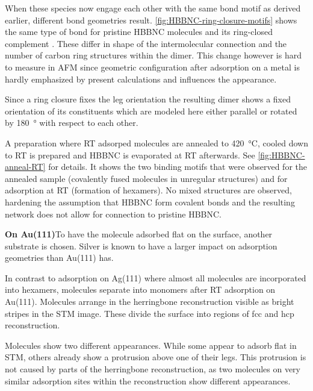 When these species now engage each other with the same bond motif as derived earlier, different bond geometries result. \autoref{fig:HBBNC-ring-closure-motifs} shows the same type of bond for pristine HBBNC molecules   and its ring-closed complement . These differ in shape of the intermolecular connection and the number of carbon ring structures within the dimer. This change however is hard to measure in AFM since geometric configuration after adsorption on a metal is hardly emphasized by present calculations and influences the appearance.

Since a ring closure fixes the leg orientation the resulting dimer shows a fixed orientation of its constituents which are modeled here either parallel or rotated by \SI{180}{\degree} with respect to each other.

A preparation where RT adsorped molecules are annealed to \SI{420}{\celsius}, cooled down to RT is prepared and HBBNC is evaporated at RT afterwards. See \autoref{fig:HBBNC-anneal-RT} for details. It shows the two binding motifs that were observed for the annealed sample (covalently fused molecules in unregular structures) and for adsorption at RT (formation of hexamers). No mixed structures are observed, hardening the assumption that HBBNC form covalent bonds and the resulting network does not allow for connection to pristine HBBNC.

\textbf{On Au(111)}To have the molecule adsorbed flat on the surface, another substrate is chosen. Silver is known to have a larger impact on adsorption geometries than Au(111) has.

In contrast to adsorption on Ag(111) where almost all molecules are incorporated into hexamers, molecules separate into monomers after RT adsorption on Au(111). Molecules arrange in the herringbone reconstruction visible as bright stripes in the STM image. These divide the surface into regions of fcc and hcp reconstruction.

Molecules show two different appearances. While some appear to adsorb flat in STM, others already show a protrusion above one of their legs. This protrusion is not caused by parts of the herringbone reconstruction, as two molecules on very similar adsorption sites within the reconstruction show different appearances.

